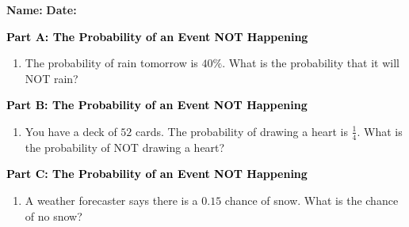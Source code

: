 \documentclass[12pt, letterpaper, fleqn]{article}
\newcommand{\blank}{\underline{\hspace{2.2cm}}}
\begin{document}
\textbf{Name:} \underline{\hspace{5cm}}
\hfill
\textbf{Date:} \underline{\hspace{3cm}}\\

\begin{tcolorbox}[colback=customteal!20]
\large\textcolor{black}{\textbf{Part A: The Probability of an Event NOT Happening}}
\end{tcolorbox}

\vspace{3mm}

\begin{enumerate}[itemsep=4.2cm, leftmargin=0.6cm]
\item The probability of rain tomorrow is $40\%$. What is the probability that it will NOT rain? \blank
\end{enumerate}

\newpage

\begin{tcolorbox}[colback=customteal!20]
\large\textcolor{black}{\textbf{Part B: The Probability of an Event NOT Happening}}
\end{tcolorbox}

\vspace{3mm}

\begin{enumerate}[itemsep=4.2cm, leftmargin=0.6cm, resume]
\item You have a deck of $52$ cards. The probability of drawing a heart is $\frac{1}{4}$. What is the probability of NOT drawing a heart? \blank
\end{enumerate}

\newpage

\begin{tcolorbox}[colback=customteal!20]
\large\textcolor{black}{\textbf{Part C: The Probability of an Event NOT Happening}}
\end{tcolorbox}

\vspace{3mm}

\begin{enumerate}[itemsep=4.2cm, leftmargin=0.6cm, resume]
\item A weather forecaster says there is a $0.15$ chance of snow. What is the chance of no snow? \blank
\end{enumerate}
\end{document}
